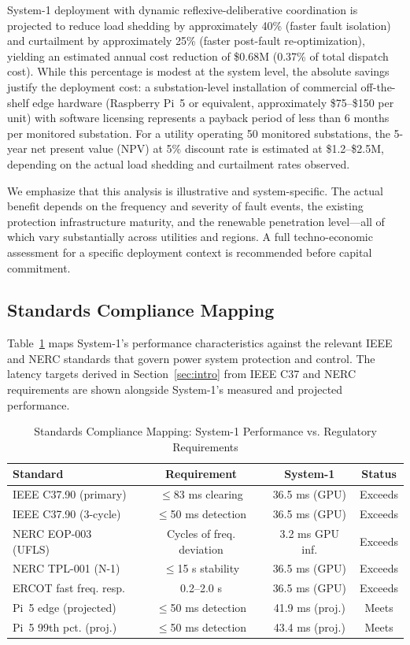 \documentclass[journal]{IEEEtran}
\begin{document}
System-1 deployment with dynamic reflexive-deliberative coordination is projected to reduce load shedding by approximately 40\% (faster fault isolation) and curtailment by approximately 25\% (faster post-fault re-optimization), yielding an estimated annual cost reduction of \$0.68M (0.37\% of total dispatch cost). While this percentage is modest at the system level, the absolute savings justify the deployment cost: a substation-level installation of commercial off-the-shelf edge hardware (Raspberry Pi~5 or equivalent, approximately \$75--\$150 per unit) with software licensing represents a payback period of less than 6 months per monitored substation. For a utility operating 50 monitored substations, the 5-year net present value (NPV) at 5\% discount rate is estimated at \$1.2--\$2.5M, depending on the actual load shedding and curtailment rates observed.

We emphasize that this analysis is illustrative and system-specific. The actual benefit depends on the frequency and severity of fault events, the existing protection infrastructure maturity, and the renewable penetration level---all of which vary substantially across utilities and regions. A full techno-economic assessment for a specific deployment context is recommended before capital commitment.


\subsection{Standards Compliance Mapping}

Table~\ref{tab:standards} maps System-1's performance characteristics against the relevant IEEE and NERC standards that govern power system protection and control. The latency targets derived in Section~\ref{sec:intro} from IEEE C37 and NERC requirements are shown alongside System-1's measured and projected performance.

\begin{table}[!t]
\centering
\caption{Standards Compliance Mapping: System-1 Performance vs. Regulatory Requirements}
\label{tab:standards}
\begin{tabular}{lccc}
\toprule
\textbf{Standard} & \textbf{Requirement} & \textbf{System-1} & \textbf{Status} \\
\midrule
IEEE C37.90 (primary)  & $\leq$83 ms clearing   & 36.5 ms (GPU) & Exceeds \\
IEEE C37.90 (3-cycle)  & $\leq$50 ms detection   & 36.5 ms (GPU) & Exceeds \\
NERC EOP-003 (UFLS)    & Cycles of freq. deviation & 3.2 ms GPU inf. & Exceeds \\
NERC TPL-001 (N-1)     & $\leq$15 s stability    & 36.5 ms (GPU) & Exceeds \\
ERCOT fast freq. resp. & 0.2--2.0 s              & 36.5 ms (GPU) & Exceeds \\
Pi~5 edge (projected)  & $\leq$50 ms detection   & 41.9 ms (proj.) & Meets \\
Pi~5 99th pct. (proj.) & $\leq$50 ms detection   & 43.4 ms (proj.) & Meets \\
\bottomrule
\end{tabular}
\end{table}
\end{document}
